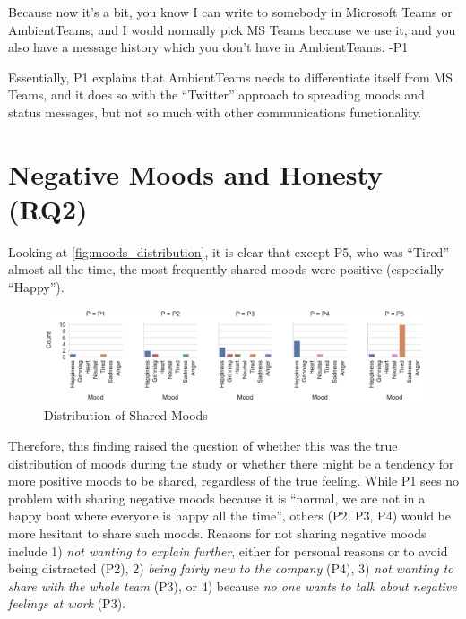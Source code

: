 \begin{displayquote}
    Because now it's a bit, you know I can write to somebody in Microsoft Teams or AmbientTeams, and I would normally pick MS Teams because we use it, and you also have a message history which you don't have in AmbientTeams. -P1
\end{displayquote}

Essentially, P1 explains that AmbientTeams needs to differentiate itself from MS Teams, and it does so with the \enquote{Twitter} approach to spreading moods and status messages, but not so much with other communications functionality.

\section{Negative Moods and Honesty (RQ2)}
\label{section:negative_moods_and_honesty}

Looking at \autoref{fig:moods_distribution}, it is clear that except P5, who was \enquote{Tired} almost all the time, the most frequently shared moods were positive (especially \enquote{Happy}).

\begin{figure}[h]
    \centering
    \includegraphics[width=\linewidth]{plots/moods_distribution.pdf}
    \caption{Distribution of Shared Moods}
    \label{fig:moods_distribution}
\end{figure}

Therefore, this finding raised the question of whether this was the true distribution of moods during the study or whether there might be a tendency for more positive moods to be shared, regardless of the true feeling. While P1 sees no problem with sharing negative moods because it is \enquote{normal, we are not in a happy boat where everyone is happy all the time}, others (P2, P3, P4) would be more hesitant to share such moods. Reasons for not sharing negative moods include 1) \textit{not wanting to explain further}, either for personal reasons or to avoid being distracted (P2), 2) \textit{being fairly new to the company} (P4), 3) \textit{not wanting to share with the whole team} (P3), or 4) because \textit{no one wants to talk about negative feelings at work} (P3).

